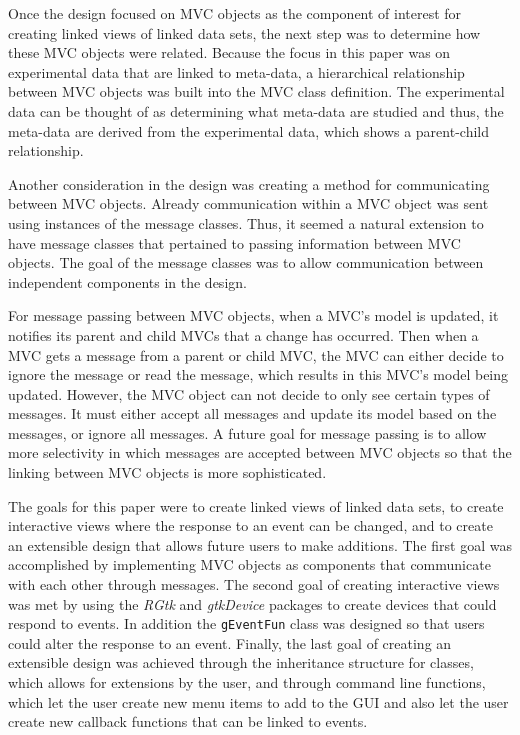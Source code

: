 \documentclass{article}[11pt]
\newcommand{\Robject}[1]{{\texttt{#1}}}
\newcommand{\Rpackage}[1]{{\textit{#1}}}
\begin{document}
Once the design focused on MVC objects as the component of interest for
creating linked views of linked data sets, the next step was to determine how
these MVC objects were related.  Because the focus in this paper was on
experimental data that are linked to meta-data, a hierarchical relationship
between MVC objects was built into the MVC class definition.  The experimental
data can be thought of as determining what meta-data are studied and thus, the
meta-data are derived from the experimental data, which shows a parent-child
relationship.  
 
Another consideration in the design was creating a method for communicating
between MVC objects.  Already communication within a MVC object was sent using
instances of the message classes.  Thus, it seemed a natural extension to have
message classes that pertained to passing information between MVC objects.
The goal of the message classes was to allow communication between independent
components in the design. 

For message passing between MVC objects, when a MVC's model is updated, it
notifies its parent and child MVCs that a change has occurred.  Then when a
MVC gets a message from a parent or child MVC, the MVC can either decide to
ignore the message or read the message, which results in this MVC's model
being updated.  However, the MVC object can not decide to only see certain
types of messages.  It must either accept all messages and update its model
based on the messages, or ignore all messages.  A future goal for message
passing is to allow more selectivity in which messages are accepted between
MVC objects so that the linking between MVC objects is more sophisticated. 

The goals for this paper were to create linked views of linked data sets, to
create interactive views where the response to an event can be changed, and to
create an extensible design that allows future users to make additions.
The first goal was accomplished by implementing MVC objects as components that
communicate with each other through messages.  The second goal of creating
interactive views was met by using the \Rpackage{RGtk} and
\Rpackage{gtkDevice} packages to create devices that could respond to events.
In addition the \Robject{gEventFun} class was designed so that users could
alter the response to an event.  Finally, the last goal of creating an
extensible design was achieved through the inheritance structure for classes,
which allows for extensions by the user, and through command line functions,
which let the user create new menu items to add to the GUI and also let the
user create new callback functions that can be linked to events. 
\end{document}
